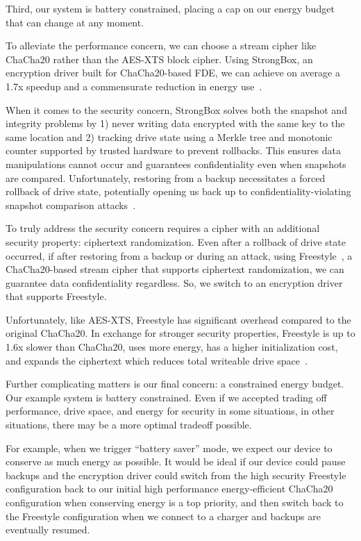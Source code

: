 Third, our system is battery constrained, placing a cap on our energy budget
that can change at any moment.

To alleviate the performance concern, we can choose a stream cipher like
ChaCha20 rather than the AES-XTS block cipher. Using StrongBox, an encryption
driver built for ChaCha20-based FDE, we can achieve on average a 1.7x speedup
and a commensurate reduction in energy use~\cite{StrongBox}.

When it comes to the security concern, StrongBox solves both the snapshot and
integrity problems by 1) never writing data encrypted with the same key to the
same location and 2) tracking drive state using a Merkle tree and monotonic
counter supported by trusted hardware to prevent rollbacks. This ensures data
manipulations cannot occur and guarantees confidentiality even when snapshots
are compared. Unfortunately, restoring from a backup necessitates a forced
rollback of drive state, potentially opening us back up to
confidentiality-violating snapshot comparison attacks~\cite{StrongBox}.

To truly address the security concern requires a cipher with an additional
security property: ciphertext randomization. Even after a rollback of drive
state occurred, if after restoring from a backup or during an attack, using
Freestyle~\cite{Freestyle}, a ChaCha20-based stream cipher that supports
ciphertext randomization, we can guarantee data confidentiality regardless. So,
we switch to an encryption driver that supports Freestyle.

Unfortunately, like AES-XTS, Freestyle has significant overhead compared to the
original ChaCha20. In exchange for stronger security properties, Freestyle is up
to 1.6x slower than ChaCha20, uses more energy, has a higher initialization
cost, and expands the ciphertext which reduces total writeable drive
space~\cite{Freestyle}.

Further complicating matters is our final concern: a constrained energy budget.
Our example system is battery constrained. Even if we accepted trading off
performance, drive space, and energy for security in some situations, in other
situations, there may be a more optimal tradeoff possible.

For example, when we trigger ``battery saver'' mode, we expect our device to
conserve as much energy as possible. It would be ideal if our device could pause
backups and the encryption driver could switch from the high security Freestyle
configuration back to our initial high performance energy-efficient ChaCha20
configuration when conserving energy is a top priority, and then switch back to
the Freestyle configuration when we connect to a charger and backups are
eventually resumed.

